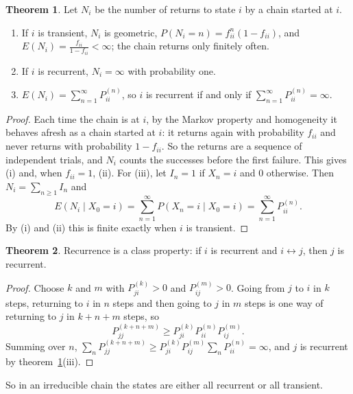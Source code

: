\documentclass[12pt,a4paper]{report}
\theoremstyle{definition}
\newtheorem{thm}{Theorem}[section]
\begin{document}
\begin{thm}
\label{thm:returns}
Let $N_i$ be the number of returns to state $i$ by a chain started at $i$.
\begin{enumerate}
\item[(i)] If $i$ is transient, $N_i$ is geometric, $P(N_i = n) = f_{ii}^n(1 - f_{ii})$, and
$E(N_i) = \frac{f_{ii}}{1 - f_{ii}}<\infty$; the chain returns only finitely often.
\item[(ii)] If $i$ is recurrent, $N_i = \infty$ with probability one.
\item[(iii)] $E(N_i) = \sum_{n=1}^\infty P_{ii}^{(n)}$, so $i$ is recurrent if and only if
$\sum_{n=1}^\infty P_{ii}^{(n)} = \infty$.
\end{enumerate}
\end{thm}

\begin{proof}
Each time the chain is at $i$, by the Markov property and homogeneity it behaves afresh as a
chain started at $i$: it returns again with probability $f_{ii}$ and never returns with
probability $1 - f_{ii}$. So the returns are a sequence of independent trials, and $N_i$ counts
the successes before the first failure. This gives (i) and, when $f_{ii} = 1$, (ii). For (iii),
let $I_n = 1$ if $X_n = i$ and $0$ otherwise. Then $N_i = \sum_{n\geq 1}I_n$ and
\[E(N_i\mid X_0 = i) = \sum_{n=1}^\infty P(X_n = i\mid X_0 = i) = \sum_{n=1}^\infty P_{ii}^{(n)} .\]
By (i) and (ii) this is finite exactly when $i$ is transient.
\end{proof}

\begin{thm}
\label{thm:classproperty}
Recurrence is a class property: if $i$ is recurrent and $i\leftrightarrow j$, then $j$ is
recurrent.
\end{thm}

\begin{proof}
Choose $k$ and $m$ with $P_{ji}^{(k)}>0$ and $P_{ij}^{(m)}>0$. Going from $j$ to $i$ in $k$ steps,
returning to $i$ in $n$ steps and then going to $j$ in $m$ steps is one way of returning to $j$
in $k + n + m$ steps, so
\[P_{jj}^{(k + n + m)}\geq P_{ji}^{(k)}P_{ii}^{(n)}P_{ij}^{(m)} .\]
Summing over $n$,
$\sum_nP_{jj}^{(k + n + m)}\geq P_{ji}^{(k)}P_{ij}^{(m)}\sum_nP_{ii}^{(n)} = \infty$, and $j$ is recurrent
by theorem~\ref{thm:returns}(iii).
\end{proof}

So in an irreducible chain the states are either all recurrent or all transient.
\end{document}
